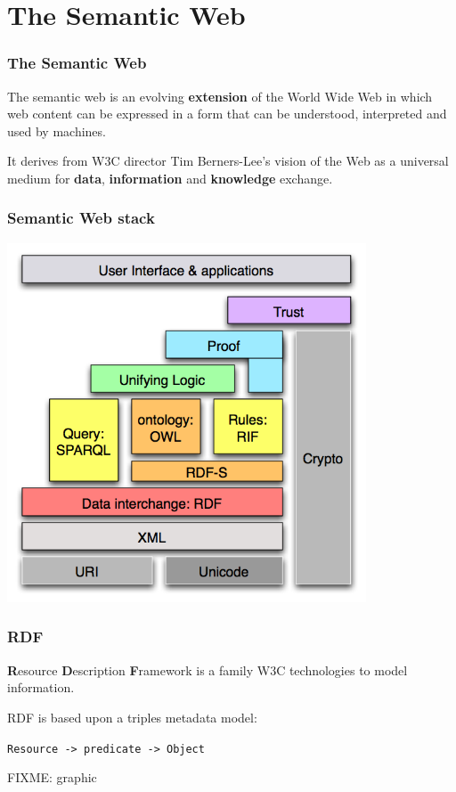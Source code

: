 \documentclass[spanish,notes=hide,16pt]{beamer}
\begin{document}
\section{The Semantic Web}
\frame
{
  \frametitle{The Semantic Web}

  \begin{Large}
    The semantic web is an evolving \textbf{extension} of the World Wide Web in 
    which web content can be expressed in a form that can be understood, 
    interpreted and used by machines.
  \end{Large}
  
  \vspace{1cm}

  \begin{Large}
    It derives from W3C director Tim Berners-Lee's vision of the Web as a universal 
    medium for \textbf{data}, \textbf{information} and \textbf{knowledge} exchange.
  \end{Large}
}
\frame
{
  \frametitle{Semantic Web stack}

  \begin{center}
    \includegraphics[width=0.8\textwidth]{images/semantic-web-stack.png}
  \end{center}

}
\frame
{
  \frametitle{RDF}

  \begin{Large}
     \textbf{R}esource \textbf{D}escription \textbf{F}ramework is a family W3C
     technologies to model information.
  \end{Large}

  \vspace{1cm}

  \begin{Large}
     RDF is based upon a triples metadata model:
     \begin{center}
       \texttt{Resource -> predicate -> Object}
     \end{center}
  \end{Large}
  FIXME: graphic
}
\end{document}

